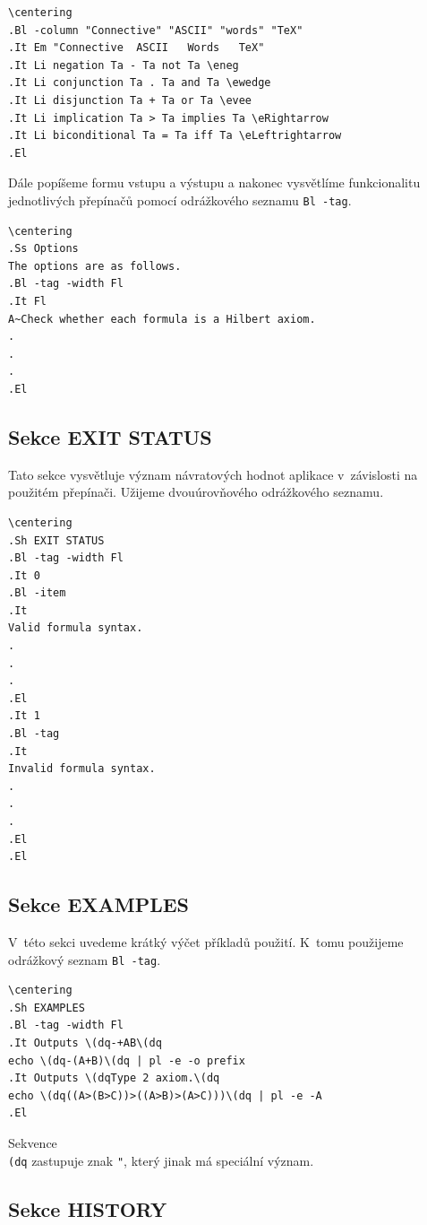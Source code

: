 \documentclass[thesis=B,czech,hidelinks]{thesis}[2012/06/26]
\begin{document}
\begin{verbatim}
\centering
.Bl -column "Connective" "ASCII" "words" "TeX"
.It Em "Connective	ASCII	Words	TeX"
.It Li negation Ta - Ta not Ta \eneg
.It Li conjunction Ta . Ta and Ta \ewedge
.It Li disjunction Ta + Ta or Ta \evee
.It Li implication Ta > Ta implies Ta \eRightarrow
.It Li biconditional Ta = Ta iff Ta \eLeftrightarrow
.El
\end{verbatim}

Dále popíšeme formu vstupu a výstupu a nakonec vysvětlíme funkcionalitu jednotlivých přepínačů pomocí odrážkového seznamu \texttt{Bl -tag}.

\begin{verbatim}
\centering
.Ss Options
The options are as follows.
.Bl -tag -width Fl
.It Fl
A~Check whether each formula is a Hilbert axiom.
.
.
.
.El
\end{verbatim}

\subsection{Sekce EXIT STATUS}

Tato sekce vysvětluje význam návratových hodnot aplikace v~závislosti na použitém přepínači. Užijeme dvouúrovňového odrážkového seznamu.

\begin{verbatim}
\centering
.Sh EXIT STATUS
.Bl -tag -width Fl
.It 0
.Bl -item
.It
Valid formula syntax.
.
.
.
.El
.It 1
.Bl -tag
.It
Invalid formula syntax.
.
.
.
.El
.El
\end{verbatim}

\subsection{Sekce EXAMPLES}

V~této sekci uvedeme krátký výčet příkladů použití. K~tomu použijeme odrážkový seznam \texttt{Bl -tag}.

\begin{verbatim}
\centering
.Sh EXAMPLES
.Bl -tag -width Fl
.It Outputs \(dq-+AB\(dq
echo \(dq-(A+B)\(dq | pl -e -o prefix
.It Outputs \(dqType 2 axiom.\(dq
echo \(dq((A>(B>C))>((A>B)>(A>C)))\(dq | pl -e -A
.El
\end{verbatim}

Sekvence \texttt{\\(dq} zastupuje znak \texttt{"}, který jinak má speciální význam.

\subsection{Sekce HISTORY}
\end{document}
